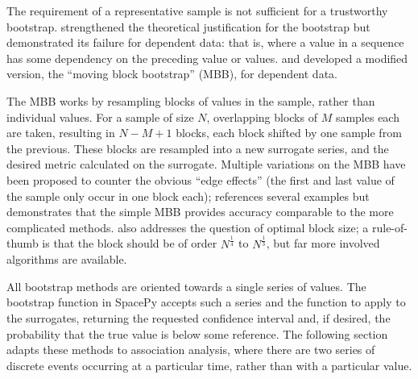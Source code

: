 \documentclass[letterpaper,11pt]{article}
\begin{document}
The requirement of a representative sample is not sufficient for
a trustworthy bootstrap. \citet{singh81} strengthened the theoretical
justification for the bootstrap but demonstrated its failure for
dependent data: that is, where a value in a sequence has some
dependency on the preceding value or values. \citet{kunsch89} and
\citet{liu92} developed a modified version, the ``moving block
bootstrap'' (MBB), for dependent data.

The MBB works by resampling blocks of values in the sample, rather
than individual values. For a sample of size $N$, overlapping blocks
of $M$ samples each are taken, resulting in $N-M+1$ blocks, each
block shifted by one sample from the previous. These blocks are
resampled into a new surrogate series, and the desired metric
calculated on the surrogate. Multiple variations on the MBB have been
proposed to counter the obvious ``edge effects'' (the first and last
value of the sample only occur in one block each); \citet{lahiri03}
references several examples but demonstrates that the simple MBB
provides accuracy comparable to the more complicated
methods. \citet{lahiri03} also addresses the question of optimal block
size; a rule-of-thumb is that the block should be of
order $N^{\frac{1}{4}}$ to $N^{\frac{1}{3}}$, but far more involved
algorithms are available.

All bootstrap methods are oriented towards a single series of
values. The bootstrap function in SpacePy accepts such a series and
the function to apply to the surrogates, returning the requested
confidence interval and, if desired, the probability that the true
value is below some reference.  The following section adapts these
methods to association analysis, where there are two series of
discrete events occurring at a particular time, rather than with a
particular value.
\end{document}
